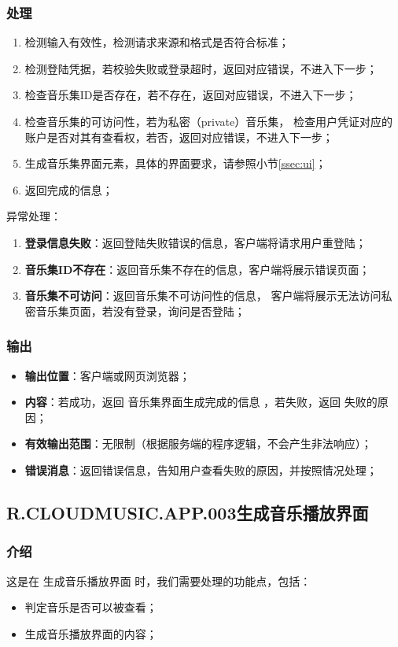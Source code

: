 \subsubsection{处理}
	\begin{enumerate}
		\item 检测输入有效性，检测请求来源和格式是否符合标准；
		\item 检测登陆凭据，若校验失败或登录超时，返回对应错误，不进入下一步；
		\item 检查音乐集ID是否存在，若不存在，返回对应错误，不进入下一步；
		\item 检查音乐集的可访问性，若为私密（private）音乐集，
			检查用户凭证对应的账户是否对其有查看权，若否，返回对应错误，不进入下一步；
		\item 生成音乐集界面元素，具体的界面要求，请参照小节\ref{ssec:ui}；
		\item 返回完成的信息；
	\end{enumerate}
	\noindent 异常处理：
	\begin{enumerate}
		\item \textbf{登录信息失败}：返回登陆失败错误的信息，客户端将请求用户重登陆；
		\item \textbf{音乐集ID不存在}：返回音乐集不存在的信息，客户端将展示错误页面；
		\item \textbf{音乐集不可访问}：返回音乐集不可访问性的信息，
			客户端将展示无法访问私密音乐集页面，若没有登录，询问是否登陆；
	\end{enumerate}
\subsubsection{输出}
\begin{itemize}
	\item \textbf{输出位置}：客户端或网页浏览器；
	\item \textbf{内容}：若成功，返回 音乐集界面生成完成的信息 ，若失败，返回 失败的原因；
	\item \textbf{有效输出范围}：无限制（根据服务端的程序逻辑，不会产生非法响应）；
	\item \textbf{错误消息}：返回错误信息，告知用户查看失败的原因，并按照情况处理；
\end{itemize}

\subsection{R.CLOUDMUSIC.APP.003生成音乐播放界面}
\subsubsection{介绍}
	这是在 生成音乐播放界面 时，我们需要处理的功能点，包括：
	\begin{itemize}
		\item 判定音乐是否可以被查看；
		\item 生成音乐播放界面的内容；
	\end{itemize}
